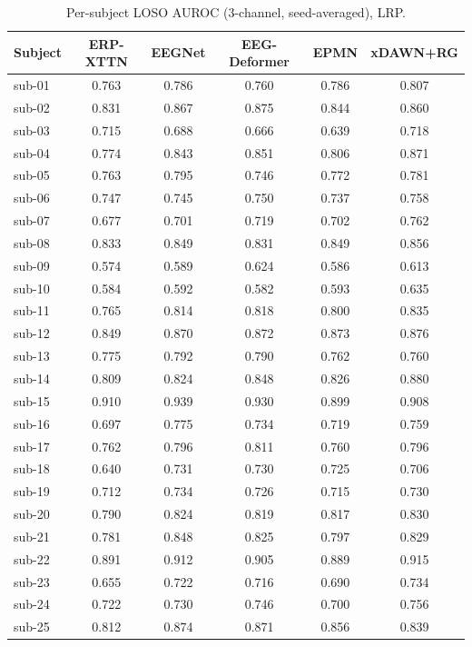 \begin{table}[t]
\centering
\scriptsize
\caption{Per-subject LOSO AUROC (3-channel, seed-averaged), LRP.}
\label{tab:persubj-lrp}
\begin{tabular}{lccccc}
\toprule
Subject & ERP-XTTN & EEGNet & EEG-Deformer & EPMN & xDAWN+RG \\
\midrule
sub-01 & 0.763 & 0.786 & 0.760 & 0.786 & 0.807 \\
sub-02 & 0.831 & 0.867 & 0.875 & 0.844 & 0.860 \\
sub-03 & 0.715 & 0.688 & 0.666 & 0.639 & 0.718 \\
sub-04 & 0.774 & 0.843 & 0.851 & 0.806 & 0.871 \\
sub-05 & 0.763 & 0.795 & 0.746 & 0.772 & 0.781 \\
sub-06 & 0.747 & 0.745 & 0.750 & 0.737 & 0.758 \\
sub-07 & 0.677 & 0.701 & 0.719 & 0.702 & 0.762 \\
sub-08 & 0.833 & 0.849 & 0.831 & 0.849 & 0.856 \\
sub-09 & 0.574 & 0.589 & 0.624 & 0.586 & 0.613 \\
sub-10 & 0.584 & 0.592 & 0.582 & 0.593 & 0.635 \\
sub-11 & 0.765 & 0.814 & 0.818 & 0.800 & 0.835 \\
sub-12 & 0.849 & 0.870 & 0.872 & 0.873 & 0.876 \\
sub-13 & 0.775 & 0.792 & 0.790 & 0.762 & 0.760 \\
sub-14 & 0.809 & 0.824 & 0.848 & 0.826 & 0.880 \\
sub-15 & 0.910 & 0.939 & 0.930 & 0.899 & 0.908 \\
sub-16 & 0.697 & 0.775 & 0.734 & 0.719 & 0.759 \\
sub-17 & 0.762 & 0.796 & 0.811 & 0.760 & 0.796 \\
sub-18 & 0.640 & 0.731 & 0.730 & 0.725 & 0.706 \\
sub-19 & 0.712 & 0.734 & 0.726 & 0.715 & 0.730 \\
sub-20 & 0.790 & 0.824 & 0.819 & 0.817 & 0.830 \\
sub-21 & 0.781 & 0.848 & 0.825 & 0.797 & 0.829 \\
sub-22 & 0.891 & 0.912 & 0.905 & 0.889 & 0.915 \\
sub-23 & 0.655 & 0.722 & 0.716 & 0.690 & 0.734 \\
sub-24 & 0.722 & 0.730 & 0.746 & 0.700 & 0.756 \\
sub-25 & 0.812 & 0.874 & 0.871 & 0.856 & 0.839 \\

\end{tabular}
\end{table}
